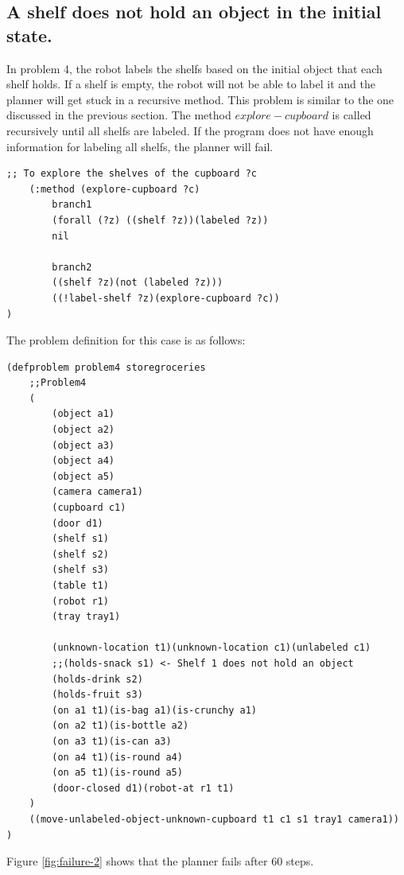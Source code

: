 \documentclass[paper=a4, fontsize=11pt]{scrartcl}
\begin{document}
\subsection{A shelf does not hold an object in the initial state.}

In problem 4, the robot labels the shelfs based on the initial object that each shelf holds. If a shelf is empty, the robot will not be able to label it and the planner will get stuck in a recursive method. This problem is similar to the one discussed in the previous section. The method $explore-cupboard$ is called recursively until all shelfs are labeled. If the program does not have enough information for labeling all shelfs, the planner will fail. \\

\begin{lstlisting}
;; To explore the shelves of the cupboard ?c
	(:method (explore-cupboard ?c)
		branch1
		(forall (?z) ((shelf ?z))(labeled ?z))
		nil

		branch2
		((shelf ?z)(not (labeled ?z)))
		((!label-shelf ?z)(explore-cupboard ?c))
)
\end{lstlisting}

\vspace{5mm}

The problem definition for this case is as follows: \\

\begin{lstlisting}
(defproblem problem4 storegroceries
	;;Problem4
	(
		(object a1)
		(object a2)
		(object a3)
		(object a4)
		(object a5)
		(camera camera1)
		(cupboard c1)
		(door d1)
		(shelf s1)
		(shelf s2)
		(shelf s3)
		(table t1)
		(robot r1)
		(tray tray1)

		(unknown-location t1)(unknown-location c1)(unlabeled c1)
		;;(holds-snack s1) <- Shelf 1 does not hold an object
		(holds-drink s2)
		(holds-fruit s3)
		(on a1 t1)(is-bag a1)(is-crunchy a1)
		(on a2 t1)(is-bottle a2)
		(on a3 t1)(is-can a3)
		(on a4 t1)(is-round a4)
		(on a5 t1)(is-round a5)
		(door-closed d1)(robot-at r1 t1)
	)
	((move-unlabeled-object-unknown-cupboard t1 c1 s1 tray1 camera1))
)

\end{lstlisting}

\vspace{5mm}

Figure \ref{fig:failure-2} shows that the planner fails after 60 steps.
\end{document}
